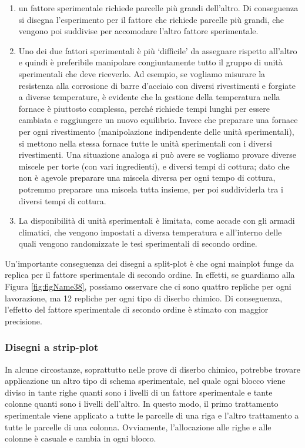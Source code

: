 \documentclass[
  12pt,
]{book}
\providecommand{\tightlist}{%
  \setlength{\itemsep}{0pt}\setlength{\parskip}{0pt}}
\begin{document}
\begin{enumerate}
\def\labelenumi{\arabic{enumi}.}
\tightlist
\item
  un fattore sperimentale richiede parcelle più grandi dell'altro. Di conseguenza si disegna l'esperimento per il fattore che richiede parcelle più grandi, che vengono poi suddivise per accomodare l'altro fattore sperimentale.
\item
  Uno dei due fattori sperimentali è più `difficile' da assegnare rispetto all'altro e quindi è preferibile manipolare congiuntamente tutto il gruppo di unità sperimentali che deve riceverlo. Ad esempio, se vogliamo misurare la resistenza alla corrosione di barre d'acciaio con diversi rivestimenti e forgiate a diverse temperature, è evidente che la gestione della temperatura nella fornace è piuttosto complessa, perché richiede tempi lunghi per essere cambiata e raggiungere un nuovo equilibrio. Invece che preparare una fornace per ogni rivestimento (manipolazione indipendente delle unità sperimentali), si mettono nella stessa fornace tutte le unità sperimentali con i diversi rivestimenti. Una situazione analoga si può avere se vogliamo provare diverse miscele per torte (con vari ingredienti), e diversi tempi di cottura; dato che non è agevole preparare una miscela diversa per ogni tempo di cottura, potremmo preparare una miscela tutta insieme, per poi suddividerla tra i diversi tempi di cottura.
\item
  La disponibilità di unità sperimentali è limitata, come accade con gli armadi climatici, che vengono impostati a diversa temperatura e all'interno delle quali vengono randomizzate le tesi sperimentali di secondo ordine.
\end{enumerate}

Un'importante conseguenza dei disegni a split-plot è che ogni mainplot funge da replica per il fattore sperimentale di secondo ordine. In effetti, se guardiamo alla Figura \ref{fig:figName38}, possiamo osservare che ci sono quattro repliche per ogni lavorazione, ma 12 repliche per ogni tipo di diserbo chimico. Di conseguenza, l'effetto del fattore sperimentale di secondo ordine è stimato con maggior precisione.

\hypertarget{disegni-a-strip-plot}{%
\subsubsection{Disegni a strip-plot}\label{disegni-a-strip-plot}}

In alcune circostanze, soprattutto nelle prove di diserbo chimico, potrebbe trovare applicazione un altro tipo di schema sperimentale, nel quale ogni blocco viene diviso in tante righe quanti sono i livelli di un fattore sperimentale e tante colonne quanti sono i livelli dell'altro. In questo modo, il primo trattamento sperimentale viene applicato a tutte le parcelle di una riga e l'altro trattamento a tutte le parcelle di una colonna. Ovviamente, l'allocazione alle righe e alle colonne è casuale e cambia in ogni blocco.
\end{document}

